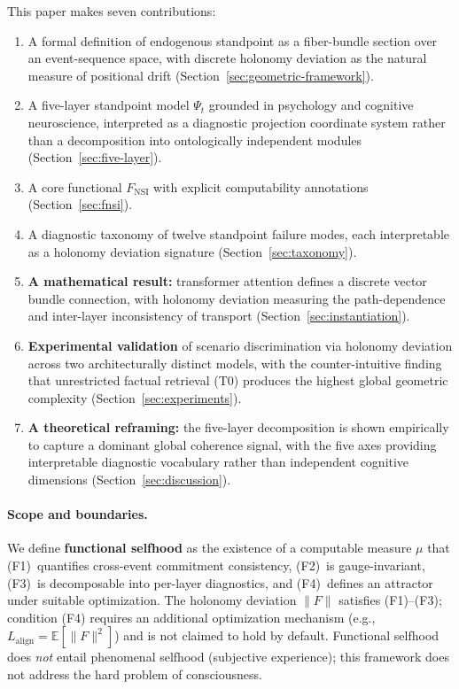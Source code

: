 This paper makes seven contributions:
\begin{enumerate}
    \item A formal definition of endogenous standpoint as a fiber-bundle section over an event-sequence space, with discrete holonomy deviation as the natural measure of positional drift (Section~\ref{sec:geometric-framework}).
    \item A five-layer standpoint model $\Psi_t$ grounded in psychology and cognitive neuroscience, interpreted as a diagnostic projection coordinate system rather than a decomposition into ontologically independent modules (Section~\ref{sec:five-layer}).
    \item A core functional $F_{\mathrm{NSI}}$ with explicit computability annotations (Section~\ref{sec:fnsi}).
    \item A diagnostic taxonomy of twelve standpoint failure modes, each interpretable as a holonomy deviation signature (Section~\ref{sec:taxonomy}).
    \item \textbf{A mathematical result:} transformer attention defines a discrete vector bundle connection, with holonomy deviation measuring the path-dependence and inter-layer inconsistency of transport (Section~\ref{sec:instantiation}).
    \item \textbf{Experimental validation} of scenario discrimination via holonomy deviation across two architecturally distinct models, with the counter-intuitive finding that unrestricted factual retrieval (T0) produces the highest global geometric complexity (Section~\ref{sec:experiments}).
    \item \textbf{A theoretical reframing:} the five-layer decomposition is shown empirically to capture a dominant global coherence signal, with the five axes providing interpretable diagnostic vocabulary rather than independent cognitive dimensions (Section~\ref{sec:discussion}).
\end{enumerate}

\paragraph{Scope and boundaries.}
We define \textbf{functional selfhood} as the existence of a computable measure $\mu$ that
(F1)~quantifies cross-event commitment consistency, (F2)~is gauge-invariant,
(F3)~is decomposable into per-layer diagnostics, and (F4)~defines an attractor under
suitable optimization. The holonomy deviation $\|F\|$ satisfies (F1)--(F3); condition (F4) requires
an additional optimization mechanism (e.g., $L_{\mathrm{align}} = \mathbb{E}[\|F\|^2]$)
and is not claimed to hold by default. Functional selfhood does \emph{not} entail
phenomenal selfhood (subjective experience); this framework does not address the hard
problem of consciousness.


